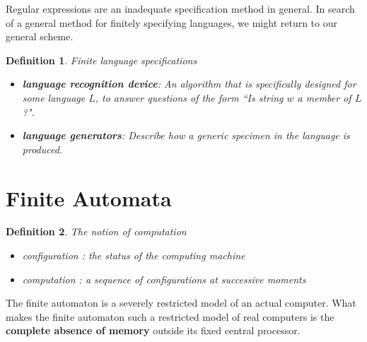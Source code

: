 \documentclass[aps,pra,onecolumn,notitlepage,superscriptaddress]{revtex4-1}
\newtheorem{defi}{Definition}
\begin{document}
    Regular expressions are an inadequate specification method in general. In search of a general method for finitely specifying languages, we might return to our general scheme.

    \begin{defi}
        Finite language specifications
        \begin{itemize}
            \item \textbf{language recognition device}: An algorithm that is specifically designed for some language $L$, to answer questions of the form ``Is string $w$ a member of $L$?".
            \item \textbf{language generators}: Describe how a generic specimen in the language is produced. 
        \end{itemize}
    \end{defi}

    \section{Finite Automata}
    \begin{defi}
        The notion of computation
        \begin{itemize}
            \item configuration : the status of the computing machine
            \item computation : a sequence of configurations at successive moments
        \end{itemize}
    \end{defi}

    The finite automaton is a severely restricted model of an actual computer. What makes the finite automaton such a restricted model of real computers is the \textbf{complete absence of memory} outside its fixed central processor.
\end{document}
